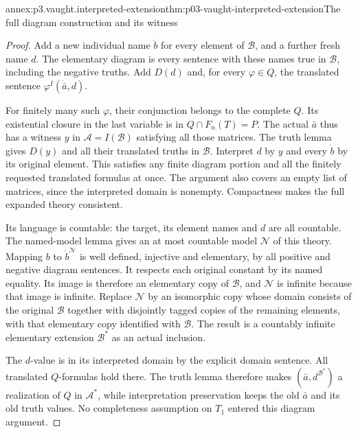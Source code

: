 \begin{annexitem}{annex:p3.vaught.interpreted-extension}{thm:p03-vaught-interpreted-extension}{The full diagram construction and its witness}
\begin{proof}
Add a new individual name \(\dot b\) for every element of
\(\mathcal B\), and a further fresh name \(d\).
The elementary diagram is every sentence with these names true in
\(\mathcal B\), including the negative truths.
Add \(D(d)\) and, for every \(\varphi\in Q\), the translated sentence
\(\varphi^I(\dot{\bar a},d)\).

For finitely many such \(\varphi\), their conjunction belongs to
the complete \(Q\). Its existential closure in the last variable
is in \(Q\cap F_n(T)=P\).
The actual \(\bar a\) thus has a witness \(y\) in
\(\mathcal A=I(\mathcal B)\) satisfying all those matrices.
The truth lemma gives \(D(y)\) and all their translated truths
in \(\mathcal B\). Interpret \(d\) by \(y\) and every \(\dot b\)
by its original element. This satisfies any finite diagram portion
and all the finitely requested translated formulas at once.
The argument also covers an empty list of matrices, since the
interpreted domain is nonempty.
Compactness makes the full expanded theory consistent.

Its language is countable: the target, its element names and \(d\)
are all countable. The named-model lemma gives an at most countable
model \(\mathcal N\) of this theory.
Mapping \(b\) to \(\dot b^{\mathcal N}\) is well defined, injective
and elementary, by all positive and negative diagram sentences.
It respects each original constant by its named equality.
Its image is therefore an elementary copy of \(\mathcal B\),
and \(\mathcal N\) is infinite because that image is infinite.
Replace \(\mathcal N\) by an isomorphic copy whose domain consists
of the original \(\mathcal B\) together with disjointly tagged
copies of the remaining elements, with that elementary copy
identified with \(\mathcal B\).
The result is a countably infinite elementary extension
\(\mathcal B^*\) as an actual inclusion.

The \(d\)-value is in its interpreted domain by the explicit
domain sentence. All translated \(Q\)-formulas hold there.
The truth lemma therefore makes
\((\bar a,d^{\mathcal B^*})\) a realization of \(Q\) in
\(\mathcal A^*\), while interpretation preservation keeps the
old \(\bar a\) and its old truth values.
No completeness assumption on \(T_1\) entered this diagram argument.
\end{proof}
\end{annexitem}

